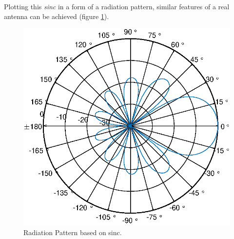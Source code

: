 Plotting this \textit{sinc} in a form of a radiation pattern, similar features of a real antenna can be achieved (figure \ref{fig:radiationpattern}).

\begin{figure}[H]
	\centering
	\includegraphics[scale=1]{figures/RadPattern.eps}
	\caption{Radiation Pattern based on sinc.}
	\label{fig:radiationpattern}
\end{figure}
